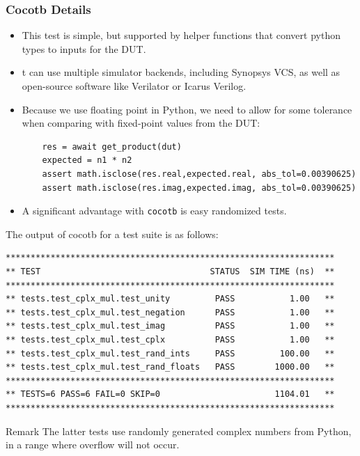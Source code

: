 \documentclass{beamer}
\begin{document}
\begin{frame}[fragile]
	\frametitle{Cocotb Details}
	\begin{itemize}
\item This test is simple, but supported by helper functions
	that convert python types to inputs for the DUT.
\item t can use multiple simulator backends, including Synopsys VCS,
	as well as open-source software like Verilator or Icarus Verilog.

\item	Because we use floating point in Python, we need to allow for some tolerance
	when comparing with fixed-point values from the DUT:
\begin{verbatim}
    res = await get_product(dut)
    expected = n1 * n2
    assert math.isclose(res.real,expected.real, abs_tol=0.00390625)
    assert math.isclose(res.imag,expected.imag, abs_tol=0.00390625)
\end{verbatim}

\item A significant advantage with \texttt{cocotb} is easy randomized tests.


\end{itemize}

\end{frame}

\begin{frame}[fragile]

The output of cocotb for a test suite is as follows:
\begin{verbatim}
******************************************************************
** TEST                                  STATUS  SIM TIME (ns)  **
******************************************************************
** tests.test_cplx_mul.test_unity         PASS           1.00   **
** tests.test_cplx_mul.test_negation      PASS           1.00   **
** tests.test_cplx_mul.test_imag          PASS           1.00   **
** tests.test_cplx_mul.test_cplx          PASS           1.00   **
** tests.test_cplx_mul.test_rand_ints     PASS         100.00   **
** tests.test_cplx_mul.test_rand_floats   PASS        1000.00   **
******************************************************************
** TESTS=6 PASS=6 FAIL=0 SKIP=0                       1104.01   **
******************************************************************
\end{verbatim}

\begin{block}{Remark}
	The latter tests use randomly generated complex numbers from Python, in a range where overflow
	will not occur.
\end{block}
\end{frame}
\end{document}
